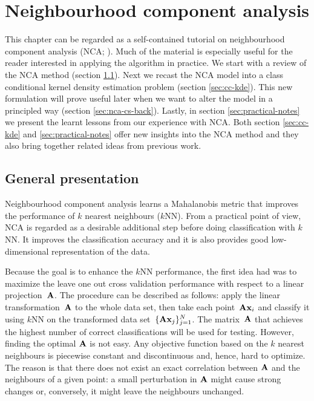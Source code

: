 \chapter{Neighbourhood component analysis}
\label{ch:nca}
	This chapter can be regarded as a self-contained tutorial on neighbourhood component analysis (NCA; \citealp{goldberger2004}). Much of the material is especially useful for the reader interested in applying the algorithm in practice. We start with a review of the NCA method (section \ref{sec:general-presentation}). Next we recast the NCA model into a class conditional kernel density estimation problem (section \ref{sec:cc-kde}). This new formulation will prove useful later when we want to alter the model in a principled way (section \ref{sec:nca-cs-back}). Lastly, in section \ref{sec:practical-notes} we present the learnt lessons from our experience with NCA. Both section \ref{sec:cc-kde} and \ref{sec:practical-notes} offer new insights into the NCA method and they also bring together related ideas from previous work.

\section{General presentation}
\label{sec:general-presentation}
	Neighbourhood component analysis learns a Mahalanobis metric that improves the performance of $k$ nearest neighbours ($k$NN). From a practical point of view, NCA  is regarded as a desirable additional step before doing classification with $k$NN. It improves the classification accuracy and it is also provides good low-dimensional representation of the data.

	Because the goal is to enhance the $k$NN performance, the first idea \citet{goldberger2004}
	had was to maximize the leave one out cross validation performance with respect to a linear projection~$\mathbf{A}$. The procedure can be described as follows: apply the linear transformation~$\mathbf{A}$ to the whole data set, then take each 
	point~$\mathbf{A}\mathbf{x}_i$ and classify it using $k$NN on the transformed data set~$\{\mathbf{A}\mathbf{x}_j\}_{j=1}^N$. The matrix~$\mathbf{A}$ that achieves the highest number of correct classifications will be used for testing. However, finding the optimal $\mathbf{A}$ is not easy. Any objective function based on the $k$ nearest neighbours
	is piecewise constant and discontinuous and, hence, hard to optimize. The reason is that there does
	not exist an exact correlation between $\mathbf{A}$ and the neighbours
	of a given point: a small perturbation in $\mathbf{A}$ might cause strong changes or, conversely, 
	it might leave the neighbours unchanged.
	
